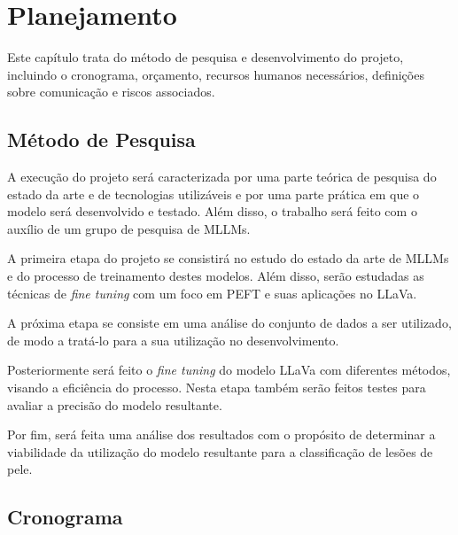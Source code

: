 \chapter{Planejamento}

Este capítulo trata do método de pesquisa e desenvolvimento do projeto, incluindo o cronograma, orçamento, recursos humanos necessários, definições sobre comunicação e
riscos associados.

\section{Método de Pesquisa}

A execução do projeto será caracterizada por uma parte teórica de pesquisa do estado da arte e de tecnologias utilizáveis e por uma parte prática em que o modelo será
desenvolvido e testado. Além disso, o trabalho será feito com o auxílio de um grupo de pesquisa de \ac{MLLMs}.

A primeira etapa do projeto se consistirá no estudo do estado da arte de \ac{MLLMs} e do processo de treinamento destes modelos. Além disso, serão estudadas as técnicas
de \textit{fine tuning} com um foco em \ac{PEFT} e suas aplicações no \ac{LLaVa}.

A próxima etapa se consiste em uma análise do conjunto de dados a ser utilizado, de modo a tratá-lo para a sua utilização no desenvolvimento.

Posteriormente será feito o \textit{fine tuning} do modelo \ac{LLaVa} com diferentes métodos, visando a eficiência do processo. Nesta etapa também serão feitos testes
para avaliar a precisão do modelo resultante.

Por fim, será feita uma análise dos resultados com o propósito de determinar a viabilidade da utilização do modelo resultante para a classificação de lesões de pele.

\section{Cronograma}

